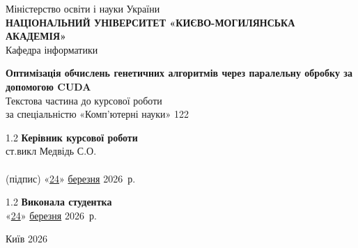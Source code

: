 \documentclass[14pt,a4paper]{extarticle}
\begin{document}
\begin{center}
\large
Міністерство освіти і науки України\\[4pt]
\textbf{НАЦІОНАЛЬНИЙ УНІВЕРСИТЕТ «КИЄВО-МОГИЛЯНСЬКА АКАДЕМІЯ»}\\[2pt]
Кафедра інформатики
\end{center}

\vspace{40mm}

\begin{center}
\LARGE \textbf{Оптимізація обчислень генетичних алгоритмів через паралельну обробку за допомогою CUDA}\\[10mm]
\large Текстова частина до курсової роботи\\
за спеціальністю «Комп'ютерні науки» 122
\end{center}

\vspace{40mm}

\hfill
\begin{minipage}{0.55\textwidth}
\begin{spacing}{1.2}
\textbf{Керівник курсової роботи}\\
ст.викл {Медвідь С.О.} \\

\underline{\hspace{55mm}}\\
(підпис) \hfill «\underline{\hspace{2mm}24\hspace{2mm}}» \underline{\hspace{3mm}березня\hspace{3mm}} 2026~р.
\end{spacing}
\end{minipage}

\vspace{15mm}

\hfill
\begin{minipage}{0.55\textwidth}
\begin{spacing}{1.2}
\textbf{Виконала студентка} \\

«\underline{\hspace{2mm}24\hspace{2mm}}» \underline{\hspace{3mm}березня\hspace{3mm}} 2026~р.
\end{spacing}
\end{minipage}

\vfill

\begin{center}
Київ 2026
\end{center}
\end{document}
